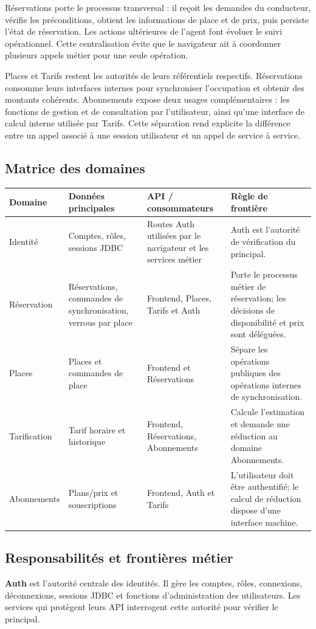 \documentclass[11pt,a4paper]{report}
\begin{document}
Réservations porte le processus transversal : il reçoit les demandes du conducteur, vérifie les préconditions, obtient les informations de place et de prix, puis persiste l'état de réservation. Les actions ultérieures de l'agent font évoluer le suivi opérationnel. Cette centralisation évite que le navigateur ait à coordonner plusieurs appels métier pour une seule opération.

Places et Tarifs restent les autorités de leurs référentiels respectifs. Réservations consomme leurs interfaces internes pour synchroniser l'occupation et obtenir des montants cohérents. Abonnements expose deux usages complémentaires : les fonctions de gestion et de consultation par l'utilisateur, ainsi qu'une interface de calcul interne utilisée par Tarifs. Cette séparation rend explicite la différence entre un appel associé à une session utilisateur et un appel de service à service.

\subsection{Matrice des domaines}
\begin{longtable}{p{2.6cm}p{3.2cm}p{4.3cm}p{3.4cm}}
\toprule
\textbf{Domaine} & \textbf{Données principales} & \textbf{API / consommateurs} & \textbf{Règle de frontière} \\
\midrule
Identité & Comptes, rôles, sessions JDBC & Routes Auth utilisées par le navigateur et les services métier & Auth est l'autorité de vérification du principal. \\
Réservation & Réservations, commandes de synchronisation, verrous par place & Frontend, Places, Tarifs et Auth & Porte le processus métier de réservation; les décisions de disponibilité et prix sont déléguées. \\
Places & Places et commandes de place & Frontend et Réservations & Sépare les opérations publiques des opérations internes de synchronisation. \\
Tarification & Tarif horaire et historique & Frontend, Réservations, Abonnements & Calcule l'estimation et demande une réduction au domaine Abonnements. \\
Abonnements & Plans/prix et souscriptions & Frontend, Auth et Tarifs & L'utilisateur doit être authentifié; le calcul de réduction dispose d'une interface machine. \\
\bottomrule
\end{longtable}

\subsection{Responsabilités et frontières métier}
\textbf{Auth} est l'autorité centrale des identités. Il gère les comptes, rôles, connexions, déconnexions, sessions JDBC et fonctions d'administration des utilisateurs. Les services qui protègent leurs API interrogent cette autorité pour vérifier le principal.
\end{document}

